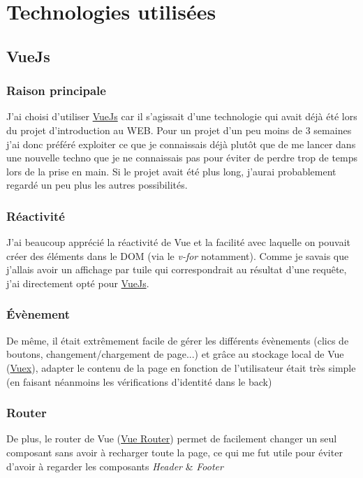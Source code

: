 \documentclass[english,12pt,a4paper]{report}
\newcommand{\ul}[1]{%
	\uline{\phantom{#1}}%
	\llap{\contour{white}{#1}}%
}
\begin{document}
\tableofcontents
\pagebreak

\part{Technologies utilisées}
\chapter{VueJs}
\section{Raison principale}
J'ai choisi d'utiliser \href{https://vuejs.org/}{VueJs} car il s'agissait d'une technologie qui avait déjà été \ul{vue} lors du projet d'introduction au WEB. Pour un projet d'un peu moins de 3 semaines j'ai donc préféré exploiter ce que je connaissais déjà plutôt que de me lancer dans une nouvelle techno que je ne connaissais pas pour éviter de perdre trop de temps lors de la prise en main. Si le projet avait été plus long, j'aurai probablement regardé un peu plus les autres possibilités.

\section{Réactivité}
J'ai beaucoup apprécié la réactivité de Vue et la facilité avec laquelle on pouvait créer des éléments dans le DOM (via le \textit{v-for} notamment). Comme je savais que j'allais avoir un affichage par tuile qui correspondrait au résultat d'une requête, j'ai directement opté pour \href{https://vuejs.org/}{VueJs}.

\section{Évènement}
De même, il était extrêmement facile de gérer les différents évènements (clics de boutons, changement/chargement de page...) et grâce au stockage local de Vue (\href{https://vuex.vuejs.org/}{Vuex}), adapter le contenu de la page en fonction de l'utilisateur était très simple (en faisant néanmoins les vérifications d'identité dans le back)

\section{Router}
De plus, le router de Vue (\href{https://router.vuejs.org/}{Vue Router}) permet de facilement changer un seul composant sans avoir à recharger toute la page, ce qui me fut utile pour éviter d'avoir à regarder les composants \textit{Header} \& \textit{Footer}
\end{document}
